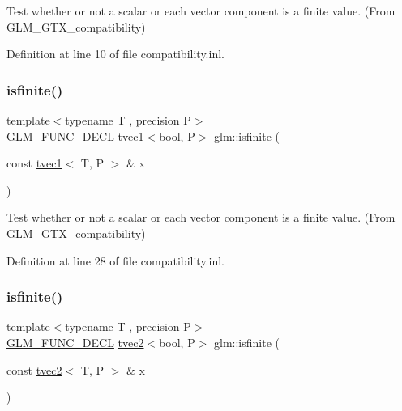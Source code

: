 Test whether or not a scalar or each vector component is a finite value. (From G\+L\+M\+\_\+\+G\+T\+X\+\_\+compatibility) 



Definition at line 10 of file compatibility.\+inl.

\mbox{\label{group__gtx__compatibility_ga553e2e95b06a0f70c718605998889d3b}} 
\subsubsection{\texorpdfstring{isfinite()}{isfinite()}\hspace{0.1cm}{\footnotesize\ttfamily [2/5]}}
{\footnotesize\ttfamily template$<$typename T , precision P$>$ \\
\mbox{\hyperlink{setup_8hpp_ab2d052de21a70539923e9bcbf6e83a51}{G\+L\+M\+\_\+\+F\+U\+N\+C\+\_\+\+D\+E\+CL}} \mbox{\hyperlink{structglm_1_1tvec1}{tvec1}}$<$bool, P$>$ glm\+::isfinite (\begin{DoxyParamCaption}\item[{const \mbox{\hyperlink{structglm_1_1tvec1}{tvec1}}$<$ T, P $>$ \&}]{x }\end{DoxyParamCaption})}



Test whether or not a scalar or each vector component is a finite value. (From G\+L\+M\+\_\+\+G\+T\+X\+\_\+compatibility) 



Definition at line 28 of file compatibility.\+inl.

\mbox{\label{group__gtx__compatibility_ga7dd492aa7d6ec21715f9a91b6e5e596a}} 
\subsubsection{\texorpdfstring{isfinite()}{isfinite()}\hspace{0.1cm}{\footnotesize\ttfamily [3/5]}}
{\footnotesize\ttfamily template$<$typename T , precision P$>$ \\
\mbox{\hyperlink{setup_8hpp_ab2d052de21a70539923e9bcbf6e83a51}{G\+L\+M\+\_\+\+F\+U\+N\+C\+\_\+\+D\+E\+CL}} \mbox{\hyperlink{structglm_1_1tvec2}{tvec2}}$<$bool, P$>$ glm\+::isfinite (\begin{DoxyParamCaption}\item[{const \mbox{\hyperlink{structglm_1_1tvec2}{tvec2}}$<$ T, P $>$ \&}]{x }\end{DoxyParamCaption})}



